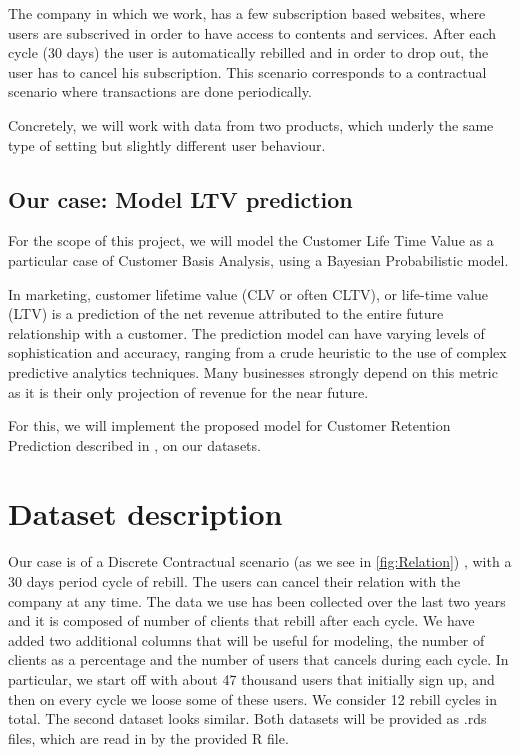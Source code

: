 \documentclass[paper=a4, fontsize=11pt]{scrartcl} %
\numberwithin{equation}{section} %
\numberwithin{figure}{section} %
\numberwithin{table}{section} %
\begin{document}
The company in which we work, has a few subscription based websites, where users are subscrived in order to have access to contents and services. After each cycle (30 days) the user is automatically rebilled and in order to drop out, the user has to cancel his subscription. This scenario corresponds to a contractual scenario where transactions are done periodically.

Concretely, we will work with data from two products, which underly the same type of setting but slightly different user behaviour.

\subsection{Our case: Model LTV prediction}
For the scope of this project, we will model the Customer Life Time Value as a particular case of Customer Basis Analysis, using a Bayesian Probabilistic model.

In marketing, customer lifetime value (CLV or often CLTV), or life-time value (LTV) is a prediction of the net revenue attributed to the entire future relationship with a customer. The prediction model can have varying levels of sophistication and accuracy, ranging from a crude heuristic to the use of complex predictive analytics techniques. Many businesses strongly depend on this metric as it is their only projection of revenue for the near future.

For this, we will implement the proposed model for Customer Retention Prediction described in \cite{fader07}, on our datasets.

\section{Dataset description}

 Our case is of a Discrete Contractual scenario (as we see in \ref{fig:Relation}) , with a 30 days period cycle of rebill. The users can cancel their relation with the company at any time.
 The data we use has been collected over the last two years and it is composed of number of clients that rebill after each cycle. We have added two additional columns that will be useful for modeling, the number of clients as a percentage and the number of users that cancels during each cycle. In particular, we start off with about 47 thousand users that initially sign up, and then on every cycle we loose some of these users. We consider 12 rebill cycles in total. The second dataset looks similar. Both datasets will be provided as .rds files, which are read in by the provided R file.
\end{document}
